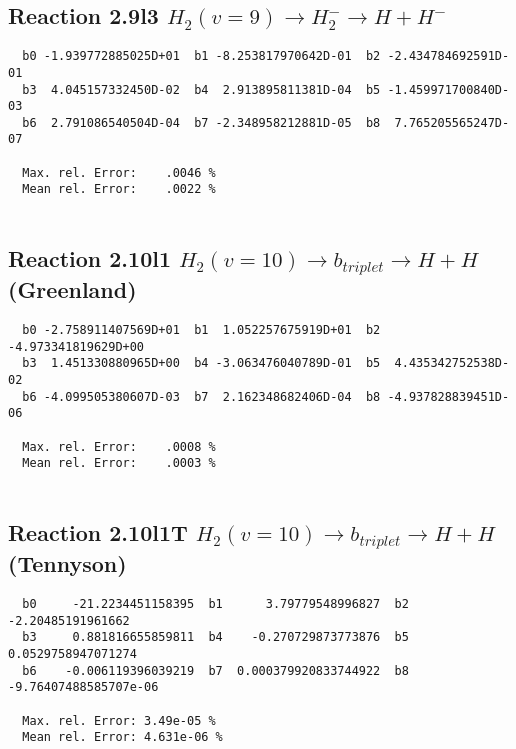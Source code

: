\documentclass[12pt]{article}
\begin{document}
\subsection{
Reaction 2.9l3
 $ H_2(v=9) \rightarrow H_2^- \rightarrow H + H^-$
}


\begin{small}\begin{verbatim}
  b0 -1.939772885025D+01  b1 -8.253817970642D-01  b2 -2.434784692591D-01
  b3  4.045157332450D-02  b4  2.913895811381D-04  b5 -1.459971700840D-03
  b6  2.791086540504D-04  b7 -2.348958212881D-05  b8  7.765205565247D-07

  Max. rel. Error:    .0046 %
  Mean rel. Error:    .0022 %


\end{verbatim}\end{small}


\newpage
\subsection{
Reaction 2.10l1
$ H_2(v=10) \rightarrow b_{triplet}\rightarrow H + H $ (Greenland) 
}


\begin{small}\begin{verbatim}
  b0 -2.758911407569D+01  b1  1.052257675919D+01  b2 -4.973341819629D+00
  b3  1.451330880965D+00  b4 -3.063476040789D-01  b5  4.435342752538D-02
  b6 -4.099505380607D-03  b7  2.162348682406D-04  b8 -4.937828839451D-06

  Max. rel. Error:    .0008 %
  Mean rel. Error:    .0003 %


\end{verbatim}\end{small}


\subsection{
Reaction 2.10l1T
$  H_2(v=10) \rightarrow b_{triplet}\rightarrow H + H $ (Tennyson)
}


\begin{small}\begin{verbatim}
  b0     -21.2234451158395  b1      3.79779548996827  b2     -2.20485191961662
  b3     0.881816655859811  b4    -0.270729873773876  b5    0.0529758947071274
  b6    -0.006119396039219  b7  0.000379920833744922  b8 -9.76407488585707e-06

  Max. rel. Error: 3.49e-05 %
  Mean rel. Error: 4.631e-06 %
\end{verbatim}\end{small}
\end{document}

